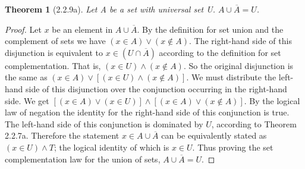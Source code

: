 \documentclass[a4paper, 12pt]{article}
\theoremstyle{plain}
\newtheorem*{theorem*}{Theorem}
\begin{document}
	
	\begin{theorem*}[2.2.9a]
		Let A be a set with universal set U. $A \cup \overline{A} = U$.
	\end{theorem*}
	
	\begin{proof}
		Let $x$ be an element in $A \cup \overline{A}$. By the definition for set union and the complement 
		of sets we have $(x \in A) \lor (x \notin A)$. The right-hand side of this disjunction is 
		equivalent to $x \in (U \cap \overline{A})$ according to the definition for set complementation. 
		That is, $(x \in U) \land (x \notin A)$. So the original disjunction is the same as 
		$(x \in A) \lor [(x \in U) \land (x \notin A)]$. We must distribute the left-hand side of this 
		disjunction over the conjunction occurring in the right-hand side. We get 
		$[(x \in A) \lor (x \in U)] \land [(x \in A) \lor (x \notin A)]$. By the logical law of negation 
		the identity for the right-hand side of this conjunction is true. The left-hand side of this 
		conjunction is dominated by $U$, according to Theorem 2.2.7a. Therefore the statement 
		$x \in A \cup \overline{A}$ can be equivalently stated as $(x \in U) \land T$; the logical identity 
		of which is $x \in U$. Thus proving the set complementation law for the union of sets, 
		$A \cup \overline{A} = U$.
	\end{proof}
\end{document}
